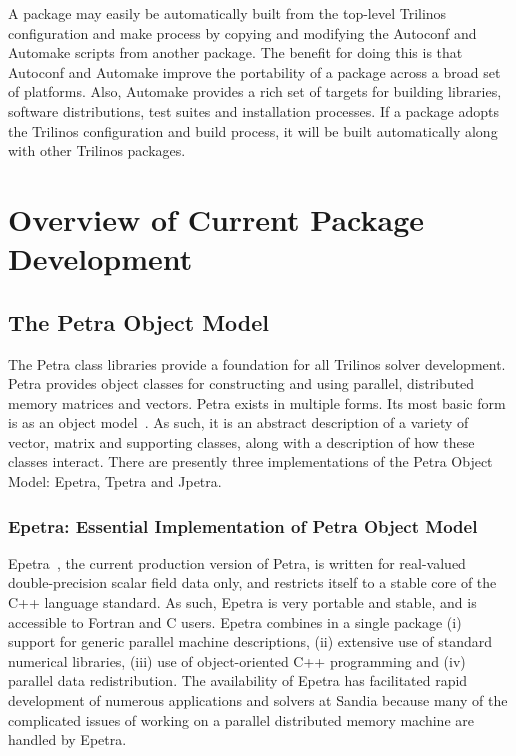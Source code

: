 \documentclass[12pt,relax]{TrilinosOverview}
\begin{document}
A package may easily be automatically built from the top-level
Trilinos configuration and make process by copying and modifying the
Autoconf and Automake scripts from another package.  The benefit for
doing this is that Autoconf and Automake improve the portability of a
package across a broad set of platforms.  Also, Automake provides a
rich set of targets for building libraries, software distributions,
test suites and installation processes.  If a package adopts the
Trilinos configuration and build process, it will be built
automatically along with other Trilinos packages.

\section{Overview of Current Package Development}
\label{sect:Software}

\subsection{The Petra Object Model}
\label{subsect:PetraObjectModel}
The Petra class libraries provide a
foundation for all Trilinos solver development.  Petra provides 
object classes for
constructing and using parallel, distributed memory matrices and vectors.  
Petra exists in
multiple forms.  Its most basic form is as an object 
model~\cite{HeroHoekWill2002}.
As such, it is an abstract 
description of a variety of vector, matrix and supporting classes, along with a 
description of
how these classes interact.  There are presently three implementations
of the Petra Object Model: Epetra, Tpetra and Jpetra.

\subsubsection{Epetra: Essential Implementation of Petra Object Model}

Epetra~\cite{Epetra-User-Guide}, the current production version of Petra,
 is written for real-valued double-precision scalar field data only, and
restricts itself to a stable core
of the C++ language standard.  As such, Epetra is very portable and 
stable, and  
is accessible to Fortran and C users.  
Epetra combines in a single package (i) support 
for generic parallel
machine descriptions, (ii) extensive use of standard numerical 
libraries, (iii) use of object-oriented C++ programming and (iv) parallel data 
redistribution.  The availability of Epetra has 
facilitated rapid development
of numerous applications and solvers at Sandia because many of the 
complicated issues of
working on a parallel distributed memory machine are handled by Epetra.
\end{document}
